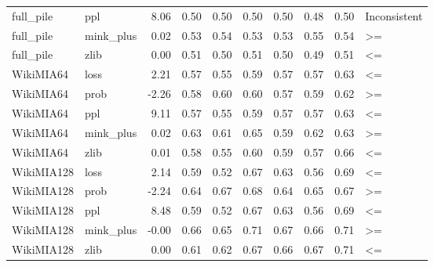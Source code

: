 \begin{tabular}{llrrrrrrrl}
 full\_pile &       ppl &           8.06 &           0.50 &         0.50 &            0.50 &          0.50 &        0.48 &           0.50 &        Inconsistent \\
 full\_pile & mink\_plus &           0.02 &           0.53 &         0.54 &            0.53 &          0.53 &        0.55 &           0.54 &                  >= \\
 full\_pile &      zlib &           0.00 &           0.51 &         0.50 &            0.51 &          0.50 &        0.49 &           0.51 &                  <= \\
 WikiMIA64 &      loss &           2.21 &           0.57 &         0.55 &            0.59 &          0.57 &        0.57 &           0.63 &                  <= \\
 WikiMIA64 &      prob &          -2.26 &           0.58 &         0.60 &            0.60 &          0.57 &        0.59 &           0.62 &                  >= \\
 WikiMIA64 &       ppl &           9.11 &           0.57 &         0.55 &            0.59 &          0.57 &        0.57 &           0.63 &                  <= \\
 WikiMIA64 & mink\_plus &           0.02 &           0.63 &         0.61 &            0.65 &          0.59 &        0.62 &           0.63 &                  >= \\
 WikiMIA64 &      zlib &           0.01 &           0.58 &         0.55 &            0.60 &          0.59 &        0.57 &           0.66 &                  <= \\
WikiMIA128 &      loss &           2.14 &           0.59 &         0.52 &            0.67 &          0.63 &        0.56 &           0.69 &                  <= \\
WikiMIA128 &      prob &          -2.24 &           0.64 &         0.67 &            0.68 &          0.64 &        0.65 &           0.67 &                  >= \\
WikiMIA128 &       ppl &           8.48 &           0.59 &         0.52 &            0.67 &          0.63 &        0.56 &           0.69 &                  <= \\
WikiMIA128 & mink\_plus &          -0.00 &           0.66 &         0.65 &            0.71 &          0.67 &        0.66 &           0.71 &                  >= \\
WikiMIA128 &      zlib &           0.00 &           0.61 &         0.62 &            0.67 &          0.66 &        0.67 &           0.71 &                  <= \\

\end{tabular}

